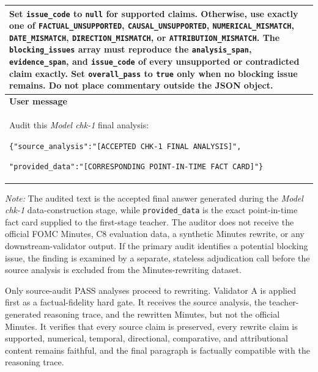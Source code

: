 \begin{table}[htbp]
\begin{threeparttable}
\begin{tabular}{@{}p{}@{}}
        Set \texttt{issue\_code} to \texttt{null} for supported claims.
        Otherwise, use exactly one of
        \texttt{FACTUAL\_UNSUPPORTED},
        \texttt{CAUSAL\_UNSUPPORTED},
        \texttt{NUMERICAL\_MISMATCH},
        \texttt{DATE\_MISMATCH},
        \texttt{DIRECTION\_MISMATCH}, or
        \texttt{ATTRIBUTION\_MISMATCH}.
        The \texttt{blocking\_issues} array must reproduce the
        \texttt{analysis\_span}, \texttt{evidence\_span}, and
        \texttt{issue\_code} of every unsupported or contradicted claim
        exactly. Set \texttt{overall\_pass} to \texttt{true} only when no
        blocking issue remains. Do not place commentary outside the JSON
        object.
        \\[6pt]

        \midrule

        \textbf{User message} \\[2pt]

        Audit this \textit{Model chk-1} final analysis:
        \par\medskip

        \texttt{\{"source\_analysis":"[ACCEPTED CHK-1 FINAL
        ANALYSIS]",}

        \texttt{"provided\_data":"[CORRESPONDING POINT-IN-TIME
        FACT CARD]"\}}
        \\

        \bottomrule
    \end{tabular}

    \begin{tablenotes}[flushleft]
        \scriptsize
        \item \textit{Note:} The audited text is the accepted final answer
        generated during the \textit{Model chk-1} data-construction stage,
        while \texttt{provided\_data} is the exact point-in-time fact card
        supplied to the first-stage teacher. The auditor does not receive the
        official FOMC Minutes, C8 evaluation data, a synthetic Minutes rewrite,
        or any downstream-validator output. If the primary audit identifies a
        potential blocking issue, the finding is examined by a separate,
        stateless adjudication call before the source analysis is excluded from
        the Minutes-rewriting dataset.
    \end{tablenotes}
    \end{threeparttable}
\end{table}

Only source-audit PASS analyses proceed to rewriting. Validator A is applied
first as a factual-fidelity hard gate. It receives the source analysis, the
teacher-generated reasoning trace, and the rewritten Minutes, but not the
official Minutes. It verifies that every source claim is preserved, every
rewrite claim is supported, numerical, temporal, directional, comparative, and
attributional content remains faithful, and the final paragraph is factually
compatible with the reasoning trace.

